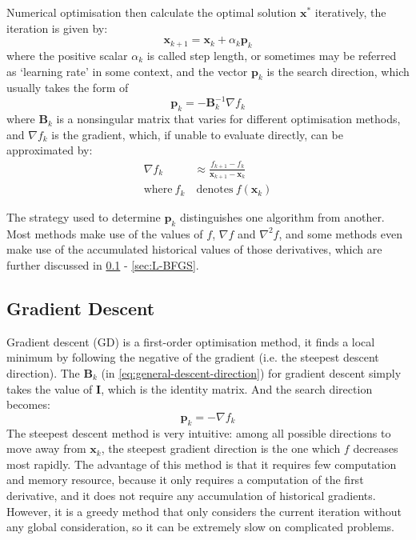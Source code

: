 Numerical optimisation then calculate the optimal solution $\textbf{x}^*$ iteratively, the iteration is given by:
\begin{equation}
  \textbf{x}_{k+1} = \textbf{x}_k+\alpha_k \textbf{p}_k
  \label{eq:optimisation_iteration}
\end{equation}
where the positive scalar $\alpha_k$ is called step length, or sometimes may be referred as `learning rate' in some context, and the vector $\textbf{p}_k$ is the search direction, which usually takes the form of
\begin{equation}
  \textbf{p}_k = -\textbf{B}_k^{-1} \nabla f_{k} \label{eq:general-descent-direction}
\end{equation}
where $\textbf{B}_k$ is a nonsingular matrix that varies for different optimisation methods, and $\nabla f_k$ is the gradient, which, if unable to evaluate directly, can be approximated by:
\begin{align}
  \nabla f_k         & \approx \frac{f_{k+1}-f_{k}}{\textbf{x}_{k+1}-\textbf{x}_{k}} \nonumber \\
  \text{where}\  f_k & \ \text{denotes}\  f(\textbf{x}_k)
\end{align}

The strategy used to determine $\textbf{p}_k$ distinguishes one algorithm from another. Most methods make use of the values of $f$, $\nabla f$ and $\nabla^2 f$, and some methods even make use of the accumulated historical values of those derivatives, which are further discussed in \cref{sec:GD} - \cref{sec:L-BFGS}.


\subsection{Gradient Descent}\label{sec:GD}
Gradient descent (GD) is a first-order optimisation method, it finds a local minimum by following the negative of the gradient (i.e. the steepest descent direction). The $\textbf{B}_k$ (in \cref{eq:general-descent-direction}) for gradient descent simply takes the value of $\textbf{I}$, which is the identity matrix. And the search direction becomes:
\begin{equation}
  \textbf{p}_k = -\nabla f_k
\end{equation}
The steepest descent method is very intuitive: among all possible directions to move away from $\textbf{x}_{k}$, the steepest gradient direction is the one which $f$ decreases most rapidly. The advantage of this method is that it requires few computation and memory resource, because it only requires a computation of the first derivative, and it does not require any accumulation of historical gradients. However, it is a greedy method that only considers the current iteration without any global consideration, so it can be extremely slow on complicated problems. \cite{Nocedal2006}

